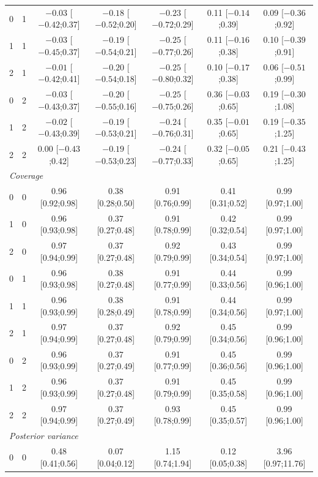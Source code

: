 \begin{table}
\begin{tabular}{cc ccccc}
    0 & 1 & $-0.03$ [$-0.42$;0.37] & $-0.18$ [$-0.52$;0.20] & $-0.23$ [$-0.72$;0.29] & 0.11 [$-0.14$;0.39] & 0.09 [$-0.36$;0.92] \\
    1 & 1 & $-0.03$ [$-0.45$;0.37] & $-0.19$ [$-0.54$;0.21] & $-0.25$ [$-0.77$;0.26] & 0.11 [$-0.16$;0.38] & 0.10 [$-0.39$;0.91] \\
    2 & 1 & $-0.01$ [$-0.42$;0.41] & $-0.20$ [$-0.54$;0.18] & $-0.25$ [$-0.80$;0.32] & 0.10 [$-0.17$;0.38] & 0.06 [$-0.51$;0.99] \\
    0 & 2 & $-0.03$ [$-0.43$;0.37] & $-0.20$ [$-0.55$;0.16] & $-0.25$ [$-0.75$;0.26] & 0.36 [$-0.03$;0.65] & 0.19 [$-0.30$;1.08] \\
    1 & 2 & $-0.02$ [$-0.43$;0.39] & $-0.19$ [$-0.53$;0.21] & $-0.24$ [$-0.76$;0.31] & 0.35 [$-0.01$;0.65] & 0.19 [$-0.35$;1.25] \\
    2 & 2 & 0.00 [$-0.43$;0.42] & $-0.19$ [$-0.53$;0.23] & $-0.24$ [$-0.77$;0.33] & 0.32 [$-0.05$;0.65] & 0.21 [$-0.43$;1.25] \\
    \midrule
    \multicolumn{7}{l}{\emph{Coverage}}\\
    0 & 0 & 0.96 [0.92;0.98] & 0.38 [0.28;0.50] & 0.91 [0.76;0.99] & 0.41 [0.31;0.52] & 0.99 [0.97;1.00] \\
    1 & 0 & 0.96 [0.93;0.98] & 0.37 [0.27;0.48] & 0.91 [0.78;0.99] & 0.42 [0.32;0.54] & 0.99 [0.97;1.00] \\
    2 & 0 & 0.97 [0.94;0.99] & 0.37 [0.27;0.48] & 0.92 [0.79;0.99] & 0.43 [0.34;0.54] & 0.99 [0.97;1.00] \\
    0 & 1 & 0.96 [0.93;0.98] & 0.38 [0.27;0.48] & 0.91 [0.77;0.99] & 0.44 [0.33;0.56] & 0.99 [0.96;1.00] \\
    1 & 1 & 0.96 [0.93;0.99] & 0.38 [0.28;0.49] & 0.91 [0.78;0.99] & 0.44 [0.34;0.56] & 0.99 [0.97;1.00] \\
    2 & 1 & 0.97 [0.94;0.99] & 0.37 [0.27;0.48] & 0.92 [0.79;0.99] & 0.45 [0.34;0.56] & 0.99 [0.96;1.00] \\
    0 & 2 & 0.96 [0.93;0.99] & 0.37 [0.27;0.49] & 0.91 [0.77;0.99] & 0.45 [0.36;0.56] & 0.99 [0.96;1.00] \\
    1 & 2 & 0.96 [0.93;0.99] & 0.37 [0.27;0.48] & 0.91 [0.79;0.99] & 0.45 [0.35;0.58] & 0.99 [0.96;1.00] \\
    2 & 2 & 0.97 [0.94;0.99] & 0.37 [0.27;0.49] & 0.93 [0.78;0.99] & 0.45 [0.35;0.57] & 0.99 [0.96;1.00] \\
    \midrule
    \multicolumn{7}{l}{\emph{Posterior variance}}\\
    0 & 0 & 0.48 [0.41;0.56] & 0.07 [0.04;0.12] & 1.15 [0.74;1.94] & 0.12 [0.05;0.38] & 3.96 [0.97;11.76] \\

\end{tabular}
\end{table}

